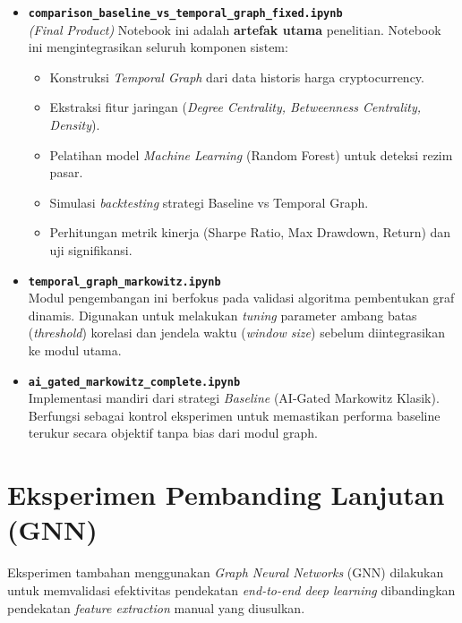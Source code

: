 \documentclass[a4paper,12pt]{article}
\begin{document}
\begin{itemize}
    \item \textbf{\texttt{comparison\_baseline\_vs\_temporal\_graph\_fixed.ipynb}} \\
    \textit{(Final Product)} Notebook ini adalah \textbf{artefak utama} penelitian. Notebook ini mengintegrasikan seluruh komponen sistem:
    \begin{itemize}[label=$\circ$]
        \item Konstruksi \textit{Temporal Graph} dari data historis harga cryptocurrency.
        \item Ekstraksi fitur jaringan (\textit{Degree Centrality, Betweenness Centrality, Density}).
        \item Pelatihan model \textit{Machine Learning} (Random Forest) untuk deteksi rezim pasar.
        \item Simulasi \textit{backtesting} strategi Baseline vs Temporal Graph.
        \item Perhitungan metrik kinerja (Sharpe Ratio, Max Drawdown, Return) dan uji signifikansi.
    \end{itemize}
    
    \item \textbf{\texttt{temporal\_graph\_markowitz.ipynb}} \\
    Modul pengembangan ini berfokus pada validasi algoritma pembentukan graf dinamis. Digunakan untuk melakukan \textit{tuning} parameter ambang batas (\textit{threshold}) korelasi dan jendela waktu (\textit{window size}) sebelum diintegrasikan ke modul utama.
    
    \item \textbf{\texttt{ai\_gated\_markowitz\_complete.ipynb}} \\
    Implementasi mandiri dari strategi \textit{Baseline} (AI-Gated Markowitz Klasik). Berfungsi sebagai kontrol eksperimen untuk memastikan performa baseline terukur secara objektif tanpa bias dari modul graph.
\end{itemize}

\section{Eksperimen Pembanding Lanjutan (GNN)}
Eksperimen tambahan menggunakan \textit{Graph Neural Networks} (GNN) dilakukan untuk memvalidasi efektivitas pendekatan \textit{end-to-end deep learning} dibandingkan pendekatan \textit{feature extraction} manual yang diusulkan.
\end{document}
